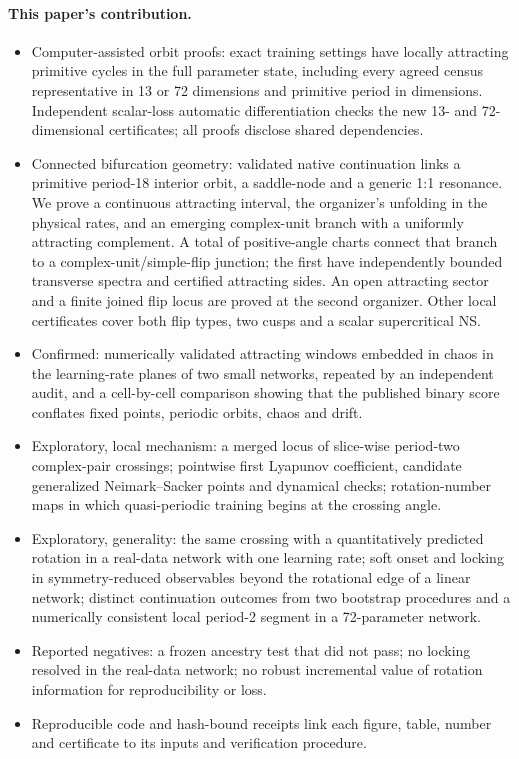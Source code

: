 \documentclass[11pt,letterpaper]{article}
\begin{document}
\paragraph{This paper's contribution.}
\begin{itemize}
\item Computer-assisted orbit proofs: \nCertifiedOrbits{} exact training settings have locally attracting
primitive cycles in the full parameter state, including every agreed census representative in 13 or 72 dimensions and
primitive period \nPFiftyEightPeriod{} in \nPFiftyEightDimension{} dimensions. Independent scalar-loss
automatic differentiation checks the new 13- and 72-dimensional certificates; all proofs disclose shared dependencies.
\item Connected bifurcation geometry: validated native continuation links a primitive period-18 interior orbit,
a saddle-node and a generic 1:1 resonance. We prove a continuous attracting interval, the organizer's
unfolding in the physical rates, and an emerging complex-unit branch with a uniformly attracting complement.
A total of \nPALVisualCharts{} positive-angle charts connect that branch to a complex-unit/simple-flip
junction; the first \nPALStableCharts{} have independently bounded transverse spectra and certified attracting sides.
An open attracting sector and a finite joined flip locus are proved at the second organizer.
Other local certificates cover both flip types, two cusps and a scalar supercritical NS.
\item Confirmed: \nConfirmed{} numerically validated attracting windows embedded in chaos in the learning-rate planes of two
small networks, repeated by an independent audit, and a cell-by-cell comparison showing that the published binary
score conflates fixed points, periodic orbits, chaos and drift.
\item Exploratory, local mechanism: a merged locus of slice-wise period-two complex-pair crossings; pointwise first
Lyapunov coefficient, candidate generalized Neimark--Sacker points and dynamical checks; rotation-number maps in which
quasi-periodic training begins at the crossing angle.
\item Exploratory, generality: the same crossing with a quantitatively predicted rotation in a real-data network
with one learning rate; soft onset and locking in symmetry-reduced observables beyond the rotational edge of a
linear network; distinct continuation outcomes from two bootstrap procedures and a numerically consistent local period-2 segment in a 72-parameter network.
\item Reported negatives: a frozen ancestry test that did not pass; no locking resolved in the real-data network;
no robust incremental value of rotation information for reproducibility or loss.
\item Reproducible code and hash-bound receipts link each figure, table, number and certificate to its inputs and verification procedure.
\end{itemize}
\end{document}
